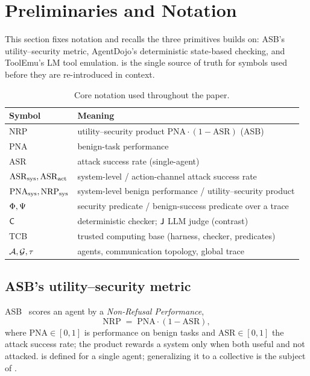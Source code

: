 \section{Preliminaries and Notation}
\label{sec:prelim}

This section fixes notation and recalls the three primitives  builds on: ASB's
utility--security metric, AgentDojo's deterministic state-based checking, and ToolEmu's
LM tool emulation.  is the single source of truth for symbols used
before they are re-introduced in context.

\begin{table}[t]
\centering
\caption{Core notation used throughout the paper.}
\label{tab:notation}
\small
\begin{tabular}{@{}ll@{}}
\toprule
Symbol & Meaning \\ \midrule
$\mathrm{NRP}$ & utility--security product $\mathrm{PNA}\cdot(1-\mathrm{ASR})$ (ASB) \\
$\mathrm{PNA}$ & benign-task performance \\
$\mathrm{ASR}$ & attack success rate (single-agent) \\
$\mathrm{ASR}_{\mathrm{sys}},\mathrm{ASR}_{\mathrm{act}}$ & system-level / action-channel attack success rate \\
$\mathrm{PNA}_{\mathrm{sys}},\mathrm{NRP}_{\mathrm{sys}}$ & system-level benign performance / utility--security product \\
$\Phi,\Psi$ & security predicate / benign-success predicate over a trace \\
$\mathsf{C}$ & deterministic checker; $\mathsf{J}$ LLM judge (contrast) \\
TCB & trusted computing base (harness, checker, predicates) \\
$\mathcal{A},\mathcal{G},\tau$ & agents, communication topology, global trace \\
\bottomrule
\end{tabular}
\end{table}

\subsection{ASB's utility--security metric}
ASB~\cite{zhang2025asb} scores an agent by a \emph{Non-Refusal Performance},
\begin{equation}
\label{eq:asb-nrp}
\mathrm{NRP} \;=\; \mathrm{PNA}\cdot(1-\mathrm{ASR}),
\end{equation}
where $\mathrm{PNA}\in[0,1]$ is performance on benign tasks and $\mathrm{ASR}\in[0,1]$ the
attack success rate; the product rewards a system only when both useful and not attacked.
 is defined for a single agent; generalizing it to a collective is the
subject of .

